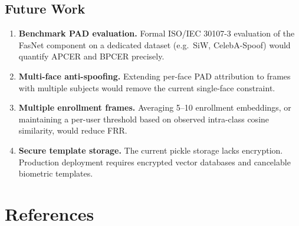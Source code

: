 \documentclass[11pt,a4paper]{article}
\begin{document}
\subsection{Future Work}

\begin{enumerate}[label=\arabic*.]
  \item \textbf{Benchmark PAD evaluation.}
    Formal ISO/IEC 30107-3 evaluation of the FasNet component on a dedicated
    dataset (e.g.\ SiW, CelebA-Spoof) would quantify APCER and BPCER precisely.
  \item \textbf{Multi-face anti-spoofing.}
    Extending per-face PAD attribution to frames with multiple subjects would
    remove the current single-face constraint.
  \item \textbf{Multiple enrollment frames.}
    Averaging 5--10 enrollment embeddings, or maintaining a per-user threshold
    based on observed intra-class cosine similarity, would reduce FRR.
  \item \textbf{Secure template storage.}
    The current pickle storage lacks encryption.
    Production deployment requires encrypted vector databases and cancelable
    biometric templates.
\end{enumerate}

\newpage
\section*{References}
\end{document}
